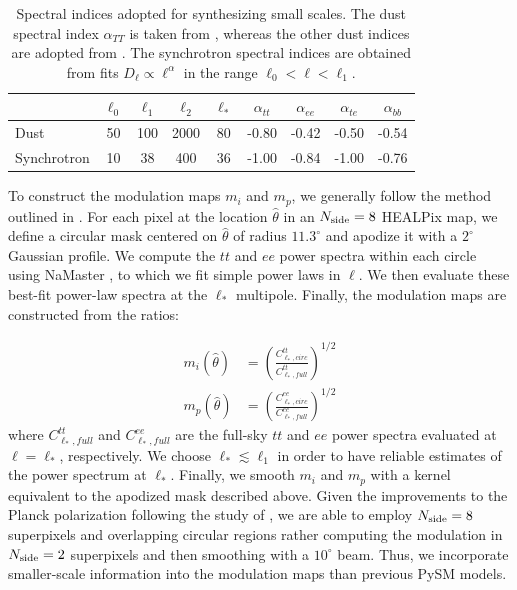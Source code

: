 \documentclass[twocolumn]{aastex631}
\begin{document}
\begin{table}
    \centering
    \footnotesize
    \begin{tabular}{lcccccccc}
    \toprule 
   & $\ell_0$ &   $ \ell_1  $&$\ell_2$   &$\ell_* $& $\alpha_{tt}$  & $\alpha_{ee}$ &$\alpha_{te}$ &$\alpha_{bb}$ \\
   \midrule  
   Dust & 50 & 100 & 2000 & 80 & -0.80 & -0.42& -0.50 & -0.54 \\ 
   Synchrotron & 10 & 38 & 400 & 36 & -1.00& -0.84 & -1.00 & -0.76 \\
   \bottomrule
    \end{tabular}
    \caption{Spectral indices adopted for synthesizing  small scales. The dust spectral index $\alpha_{TT}$ is taken from \citet{Miville-Deschenes:2016}, whereas the other dust indices are adopted from \citet{planck2016-l11A}. The synchrotron spectral indices are obtained from fits $D_{\ell} \propto \ell^{\alpha}$ in the range $\ell_0 < \ell< \ell_1$.}
    \label{tab:smallscale_par}
\end{table}

To construct the modulation maps $m_i$ and $m_p$, we generally follow the method outlined in \citet{Thorne:2017}. For each pixel at the location $\hat{\theta}$ in an $N_{\rm side} = 8$ HEALPix map, we define a circular mask centered on $\hat{\theta}$ of radius $11.3^\circ$  and apodize it with a $2^\circ$ Gaussian profile. We compute the $tt$ and $ee$ power spectra within each circle using NaMaster \citep{Alonso:2019}, to which we fit simple power laws in $\ell$. We then evaluate these best-fit power-law spectra at the $\ell_*$ multipole. Finally, the modulation maps are constructed from the ratios:

\begin{align}
\label{eq:mod_maps}
    m_i\left(\hat{\theta} \right) &= \left(\frac{C^{tt}_{\ell_*,circ}}{C^{tt}_{\ell_*,full}}\right)^{1/2} \\
    m_p\left(\hat{\theta}\right) &= \left(\frac{C^{ee}_{\ell_*,circ}}{C^{ee}_{\ell_*,full}}\right)^{1/2}
\end{align}
where $C^{tt}_{\ell_*,full}$ and $C^{ee}_{\ell_*,full}$ are the full-sky $tt$ and $ee$ power spectra evaluated at $\ell = \ell_*$, respectively. We choose $\ell_* \lesssim \ell_1$ in order to have reliable estimates of the power spectrum at $\ell_*$. Finally, we smooth $m_i$ and $m_p$ with a kernel equivalent to the apodized mask described above. Given the improvements to the Planck polarization following the study of \citet{Thorne:2017} \citep{planck2016-l01}, we are able to employ $N_{\rm side} = 8$ superpixels and overlapping circular regions rather computing the modulation in $N_{\rm side} = 2$ superpixels and then smoothing with a $10^\circ$ beam. Thus, we incorporate smaller-scale information into the modulation maps than previous PySM models.
 
\end{document}
